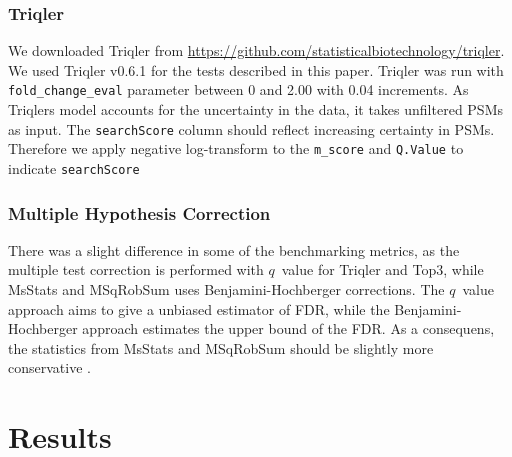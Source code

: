 \documentclass[10pt,letterpaper]{article}
\begin{document}





\subsubsection*{Triqler}

We downloaded Triqler from \url{https://github.com/statisticalbiotechnology/triqler}. We used Triqler v0.6.1 for the tests described in this paper. Triqler was run with \texttt{fold\_change\_eval} parameter between 0 and 2.00 with 0.04 increments. As Triqlers model accounts for the uncertainty in the data, it takes unfiltered PSMs as input. The \texttt{searchScore} column should reflect increasing certainty in PSMs. Therefore we apply negative log-transform to the \texttt{m\_score} and \texttt{Q.Value} to indicate \texttt{searchScore} 

\subsubsection*{Multiple Hypothesis Correction}
There was a slight difference in some of the benchmarking metrics, as the multiple test correction is performed with $q$~value for Triqler and Top3, while MsStats and MSqRobSum uses Benjamini-Hochberger \cite{benjamini1995controlling} corrections. The $q$~value approach aims to give a unbiased estimator of FDR, while the Benjamini-Hochberger approach estimates the upper bound of the FDR. As a consequens, the statistics from MsStats and MSqRobSum should be slightly more conservative \cite{korthauer2019practical}.



\section*{Results}
\end{document}
